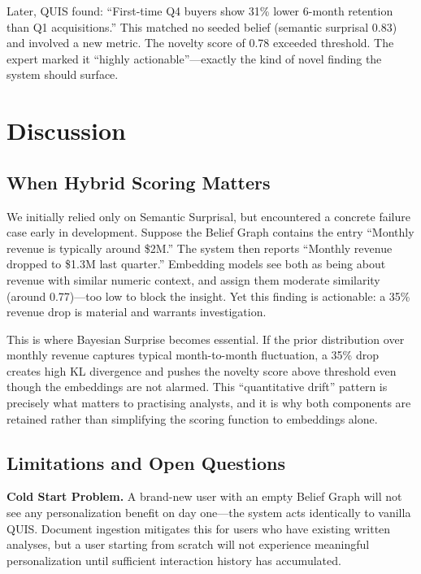 \documentclass[conference]{IEEEtran}
\begin{document}
Later, QUIS found: ``First-time Q4 buyers show 31\% lower 6-month retention
than Q1 acquisitions.'' This matched no seeded belief (semantic surprisal 0.83)
and involved a new metric. The novelty score of 0.78 exceeded threshold. The
expert marked it ``highly actionable''---exactly the kind of novel finding the
system should surface.

\section{Discussion}
\label{sec:discussion}

\subsection{When Hybrid Scoring Matters}

We initially relied only on Semantic Surprisal, but encountered a concrete
failure case early in development. Suppose the Belief Graph contains the
entry ``Monthly revenue is typically around \$2M.'' The system then reports
``Monthly revenue dropped to \$1.3M last quarter.'' Embedding models see
both as being about revenue with similar numeric context, and assign them
moderate similarity (around 0.77)---too low to block the insight. Yet this
finding is actionable: a 35\% revenue drop is material and warrants
investigation.

This is where Bayesian Surprise becomes essential. If the prior distribution
over monthly revenue captures typical month-to-month fluctuation, a 35\%
drop creates high KL divergence and pushes the novelty score above threshold
even though the embeddings are not alarmed. This ``quantitative drift''
pattern is precisely what matters to practising analysts, and it is why
both components are retained rather than simplifying the scoring function
to embeddings alone.

\subsection{Limitations and Open Questions}

\textbf{Cold Start Problem.} A brand-new user with an empty Belief
Graph will not see any personalization benefit on day one---the system
acts identically to vanilla QUIS. Document ingestion mitigates this
for users who have existing written analyses, but a user starting
from scratch will not experience meaningful personalization until
sufficient interaction history has accumulated.
\end{document}
